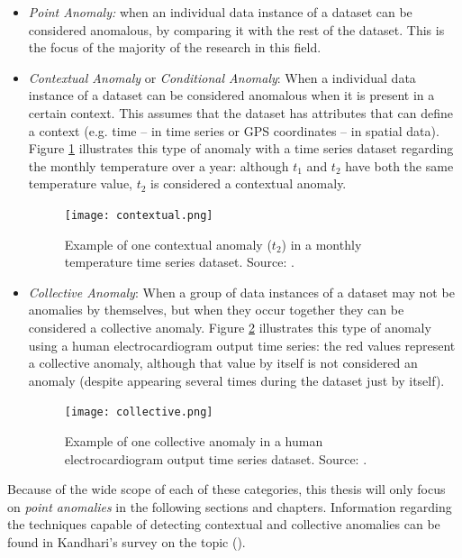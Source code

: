 \begin{itemize}
	\item \textit{Point Anomaly:} when an individual data instance of a dataset can be considered anomalous, by comparing it with the rest of the dataset. This is the focus of the majority of the research in this field.
	
	\item \textit{Contextual Anomaly} or \textit{Conditional Anomaly}: When a individual data instance of a dataset can be considered anomalous when it is present in a certain context. This assumes that the dataset has attributes that can define a context (e.g. time -- in time series or GPS coordinates -- in spatial data). Figure \ref{fig:context_anom} illustrates this type of anomaly with a time series dataset regarding the monthly temperature over a year: although $t_1$ and $t_2$ have both the same temperature value, $t_2$ is considered a contextual anomaly.
	
	\begin{figure}[!ht]
		\centering
		\texttt{[image: contextual.png]}
		\caption{Example of one contextual anomaly ($t_2$) in a monthly temperature time series dataset. Source: \cite{Kandhari2009}.}
		\label{fig:context_anom}
	\end{figure}
	
	\item \textit{Collective Anomaly}: When a group of data instances of a dataset may not be anomalies by themselves, but when they occur together they can be considered a collective anomaly.
	Figure \ref{fig:collective_anom} illustrates this type of anomaly using a human electrocardiogram output time series: the red values represent a collective anomaly, although that value by itself is not considered an anomaly (despite appearing several times during the dataset just by itself).
	
	\begin{figure}[!ht]
		\centering
		\texttt{[image: collective.png]}
		\caption{Example of one collective anomaly in a human electrocardiogram output time series dataset. Source:  \cite{Kandhari2009}.}
		\label{fig:collective_anom}
	\end{figure}
	
\end{itemize}

Because of the wide scope of each of these categories, this thesis will only focus on \textit{point anomalies} in the following sections and chapters. Information regarding the techniques capable of detecting contextual and collective anomalies can be found in Kandhari's survey on the topic (\cite{Kandhari2009}).

